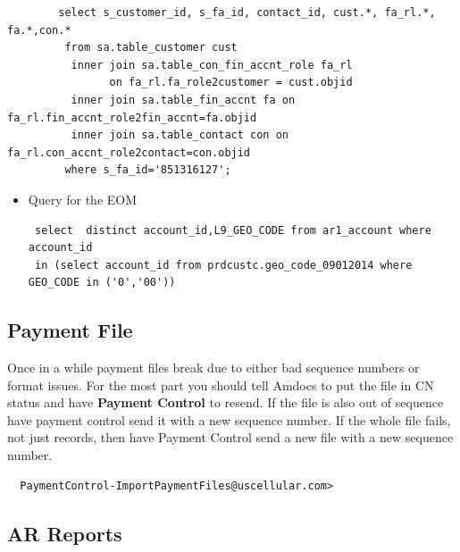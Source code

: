 \documentclass[12pt,twoside]{article}
\begin{document}
\begin{verbatim}
        select s_customer_id, s_fa_id, contact_id, cust.*, fa_rl.*, fa.*,con.*
         from sa.table_customer cust
          inner join sa.table_con_fin_accnt_role fa_rl 
                on fa_rl.fa_role2customer = cust.objid
          inner join sa.table_fin_accnt fa on fa_rl.fin_accnt_role2fin_accnt=fa.objid
          inner join sa.table_contact con on fa_rl.con_accnt_role2contact=con.objid
         where s_fa_id='851316127';
\end{verbatim}
\begin{itemize}

\item Query for the EOM
\label{sec-11-3-3-1}%
\begin{verbatim}
 select  distinct account_id,L9_GEO_CODE from ar1_account where account_id 
 in (select account_id from prdcustc.geo_code_09012014 where GEO_CODE in ('0','00'))
\end{verbatim}
\end{itemize} %
\subsection{Payment File}
\label{sec-11-4}

   Once in a while payment files break due to either bad sequence numbers or format issues. For the most part you should tell Amdocs to put the file in CN status and have \textbf{Payment Control} to resend.
   If the file is also out of sequence have payment control send it with a new sequence number. If the whole file fails, not just records, then have Payment Control send a new file with a new sequence number.
\begin{verbatim}
  PaymentControl-ImportPaymentFiles@uscellular.com>
\end{verbatim}
\subsection{AR Reports}
\label{sec-11-5}
\end{document}
